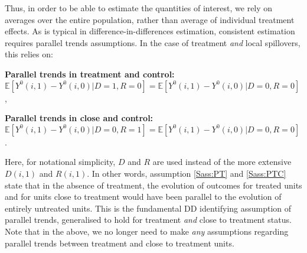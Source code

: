 Thus, in order to be able to estimate the quantities of interest, we rely on
averages over the entire population, rather than average of individual 
treatment effects.  As is typical in difference-in-differences estimation,
consistent estimation requires parallel trends assumptions.  In the case of
treatment \emph{and} local spillovers, this relies on:

\begin{assumption}{1}{}
\label{Sass:PT}
\textbf{Parallel trends in treatment and control:} \\
$\mathbb{E}[Y^0(i,1)-Y^0(i,0)|D=1,R=0]=\mathbb{E}[Y^0(i,1)-Y^0(i,0)|D=0,R=0]$,
\end{assumption}
\begin{assumption}{2}{}
\label{Sass:PTC}
\textbf{Parallel trends in close and control:} \\
$\mathbb{E}[Y^0(i,1)-Y^0(i,0)|D=0,R=1]=\mathbb{E}[Y^0(i,1)-Y^0(i,0)|D=0,R=0]$.
\end{assumption}

Here, for notational simplicity, $D$ and $R$ are used instead of the more 
extensive $D(i,1)$ and $R(i,1)$.  In other words, assumption \ref{Sass:PT}
and \ref{Sass:PTC} state that in the absence of treatment, the evolution
of outcomes for treated units and for units close to treatment would have
been parallel to the evolution of entirely untreated units.  This is the
fundamental DD identifying assumption of parallel trends, generalised to
hold for treatment \emph{and} close to treatment status.  Note that in
the above, we no longer need to make \emph{any} assumptions regarding
parallel trends between treatment and close to treatment units.

